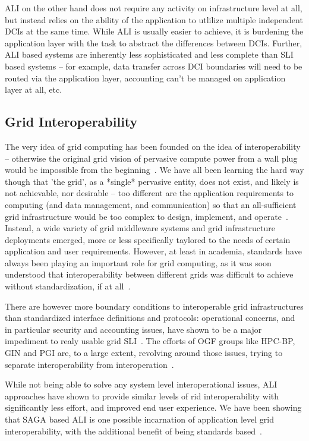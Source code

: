 \documentclass[10pt,conference,final,letterpaper,twoside,twocolumn,]{IEEEtran}
\begin{document}
 ALI on the other hand does not require any activity on infrastructure
 level at all, but instead relies on the ability of the application to
 utlilize multiple independent DCIs at the same time.  While ALI is
 usually easier to achieve, it is burdening the application layer
 with the task to abstract the differences between DCIs.  Further, ALI
 based systems are inherently less sophisticated and less complete
 than SLI based systems -- for example, data transfer across DCI
 boundaries will need to be routed via the application layer,
 accounting can't be managed on application layer at all, etc.


 \subsection*{Grid Interoperability}

 The very idea of grid computing has been founded on the idea of
 interoperability -- otherwise the original grid vision of pervasive
 compute power from a wall plug would be impossible from the
 beginning~\cite{blueprint}.  We have all been learning the hard way
 though that 'the grid', as a *single* pervasive entity, does not
 exist, and likely is not achievable, nor desirable -- too different
 are the application requirements to computing (and data management,
 and communication) so that an all-sufficient grid infrastructure
 would be too complex to design, implement, and operate~\cite{ogsa-use-cases}.
 Instead, a wide variety of grid middleware systems and grid
 infrastructure deployments emerged, more or less specifically
 taylored to the needs of certain application and user requirements.
 However, at least in academia, standards have always been playing an
 important role for grid computing, as it was soon understood that
 interoperability between different grids was difficult to achieve
 without standardization, if at all~\cite{...}.

 There are however more boundary conditions to interoperable grid
 infrastructures than standardized interface definitions and
 protocols: operational concerns, and in particular security and
 accounting issues, have shown to be a major impediment to realy
 usable grid SLI~\cite{gin-usecases}.  The efforts of OGF groups like
 HPC-BP, GIN and PGI are, to a large extent, revolving around those
 issues, trying to separate interoperability from
 interoperation~\cite{gin papers}.

 While not being able to solve any system level interoperational
 issues, ALI approaches have shown to provide similar levels of rid
 interoperability with significantly less effort, and improved end
 user experience.  We have been showing that SAGA based ALI is one
 possible incarnation of application level grid interoperability, with
 the additional benefit of being standards based~\cite{saga-gin,
 mandelbrot-www}.
\end{document}

